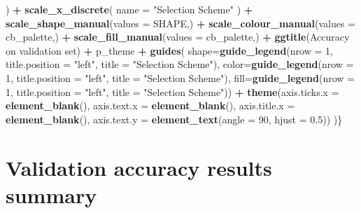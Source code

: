 \documentclass[
]{book}
\newenvironment{Shaded}{\begin{snugshade}}{\end{snugshade}}
\newcommand{\AttributeTok}[1]{\textcolor[rgb]{0.13,0.29,0.53}{#1}}
\newcommand{\DecValTok}[1]{\textcolor[rgb]{0.00,0.00,0.81}{#1}}
\newcommand{\FloatTok}[1]{\textcolor[rgb]{0.00,0.00,0.81}{#1}}
\newcommand{\FunctionTok}[1]{\textcolor[rgb]{0.13,0.29,0.53}{\textbf{#1}}}
\newcommand{\NormalTok}[1]{#1}
\newcommand{\SpecialCharTok}[1]{\textcolor[rgb]{0.81,0.36,0.00}{\textbf{#1}}}
\newcommand{\StringTok}[1]{\textcolor[rgb]{0.31,0.60,0.02}{#1}}
\begin{document}
\begin{Shaded}
\begin{Highlighting}[]
\NormalTok{    ) }\SpecialCharTok{+}
    \FunctionTok{scale\_x\_discrete}\NormalTok{(}
    \AttributeTok{name =} \StringTok{"Selection Scheme"}
\NormalTok{    ) }\SpecialCharTok{+}
    \FunctionTok{scale\_shape\_manual}\NormalTok{(}\AttributeTok{values =}\NormalTok{ SHAPE,) }\SpecialCharTok{+}
    \FunctionTok{scale\_colour\_manual}\NormalTok{(}\AttributeTok{values =}\NormalTok{ cb\_palette,) }\SpecialCharTok{+}
    \FunctionTok{scale\_fill\_manual}\NormalTok{(}\AttributeTok{values =}\NormalTok{ cb\_palette,) }\SpecialCharTok{+}
    \FunctionTok{ggtitle}\NormalTok{(}\StringTok{\textquotesingle{}Accuracy on validation set\textquotesingle{}}\NormalTok{) }\SpecialCharTok{+}
\NormalTok{    p\_theme }\SpecialCharTok{+}
    \FunctionTok{guides}\NormalTok{(}
    \AttributeTok{shape=}\FunctionTok{guide\_legend}\NormalTok{(}\AttributeTok{nrow =} \DecValTok{1}\NormalTok{, }\AttributeTok{title.position =} \StringTok{"left"}\NormalTok{,}
                        \AttributeTok{title =} \StringTok{"Selection Scheme"}\NormalTok{),}
    \AttributeTok{color=}\FunctionTok{guide\_legend}\NormalTok{(}\AttributeTok{nrow =} \DecValTok{1}\NormalTok{, }\AttributeTok{title.position =} \StringTok{"left"}\NormalTok{,}
                        \AttributeTok{title =} \StringTok{"Selection Scheme"}\NormalTok{),}
    \AttributeTok{fill=}\FunctionTok{guide\_legend}\NormalTok{(}\AttributeTok{nrow =} \DecValTok{1}\NormalTok{, }\AttributeTok{title.position =} \StringTok{"left"}\NormalTok{,}
                        \AttributeTok{title =} \StringTok{"Selection Scheme"}\NormalTok{)) }\SpecialCharTok{+}
    \FunctionTok{theme}\NormalTok{(}\AttributeTok{axis.ticks.x =} \FunctionTok{element\_blank}\NormalTok{(),}
            \AttributeTok{axis.text.x =} \FunctionTok{element\_blank}\NormalTok{(),}
            \AttributeTok{axis.title.x =} \FunctionTok{element\_blank}\NormalTok{(),}
            \AttributeTok{axis.text.y =} \FunctionTok{element\_text}\NormalTok{(}\AttributeTok{angle =} \DecValTok{90}\NormalTok{, }\AttributeTok{hjust =} \FloatTok{0.5}\NormalTok{))}
\NormalTok{)\}}
\end{Highlighting}
\end{Shaded}

\hypertarget{validation-accuracy-results-summary}{%
\section{Validation accuracy results summary}\label{validation-accuracy-results-summary}}
\end{document}
